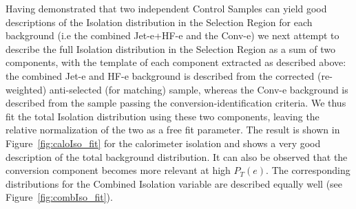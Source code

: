 Having demonstrated that two independent Control Samples can yield good descriptions of the Isolation distribution in the Selection Region for each background (i.e the combined Jet-e+HF-e and the Conv-e) we next attempt to describe the full Isolation distribution in the Selection Region as a sum of two components, with the template of each component extracted as described above: the combined Jet-e and HF-e background is described from the corrected (re-weighted) anti-selected (for matching) sample, whereas the Conv-e background is described from the sample passing the conversion-identification criteria.  We thus fit the total Isolation distribution using these two components, leaving the relative normalization of the two as a free fit parameter.  The result is shown in Figure~\ref{fig:caloIso_fit} for the calorimeter isolation and shows a very good description of the total background distribution.  It can also be observed that the conversion component becomes more relevant at high $P_T(e)$.  The corresponding distributions for the Combined Isolation variable are described equally well (see Figure~\ref{fig:combIso_fit}).

